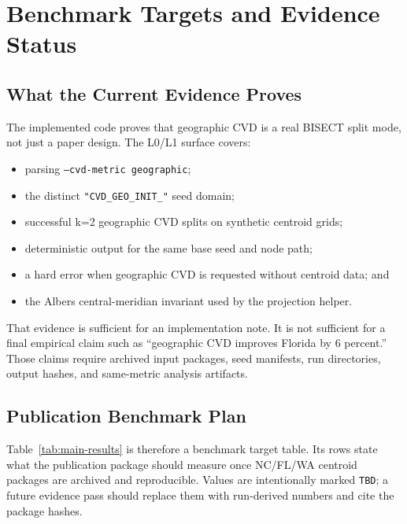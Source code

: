 \section{Benchmark Targets and Evidence Status}
\label{sec:results}

\subsection{What the Current Evidence Proves}

The implemented code proves that geographic CVD is a real BISECT split mode,
not just a paper design. The L0/L1 surface covers:

\begin{itemize}
\item parsing \texttt{--cvd-metric geographic};
\item the distinct \texttt{"CVD\_GEO\_INIT\_"} seed domain;
\item successful k=2 geographic CVD splits on synthetic centroid grids;
\item deterministic output for the same base seed and node path;
\item a hard error when geographic CVD is requested without centroid data; and
\item the Albers central-meridian invariant used by the projection helper.
\end{itemize}

That evidence is sufficient for an implementation note. It is not sufficient
for a final empirical claim such as ``geographic CVD improves Florida by
6 percent.'' Those claims require archived input packages, seed manifests,
run directories, output hashes, and same-metric analysis artifacts.

\subsection{Publication Benchmark Plan}

Table~\ref{tab:main-results} is therefore a benchmark target table. Its rows
state what the publication package should measure once NC/FL/WA centroid
packages are archived and reproducible. Values are intentionally marked
\texttt{TBD}; a future evidence pass should replace them with run-derived
numbers and cite the package hashes.


